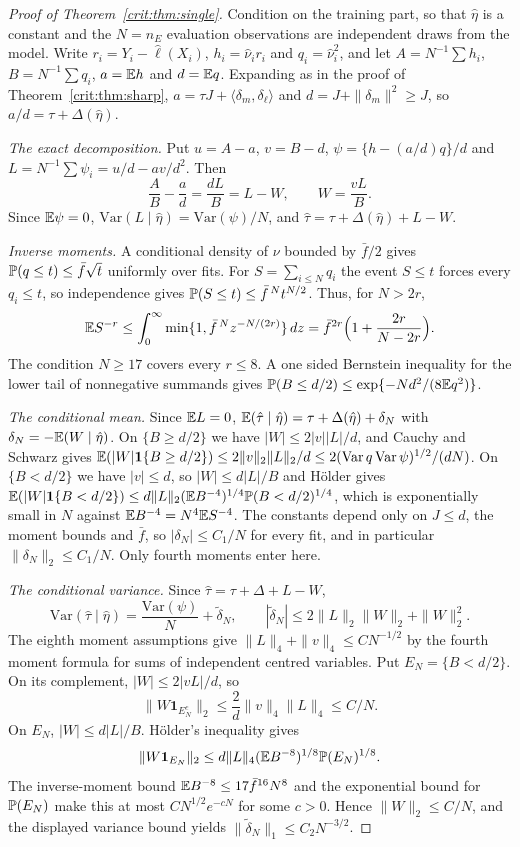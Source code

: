 \begin{proof}[Proof of Theorem~\ref{crit:thm:single}]
Condition on the training part, so that $\hat\eta$ is a constant and the $N = n_E$ evaluation observations are independent draws from the model. Write $r_i = Y_i - \hat\ell(X_i)$, $h_i = \hat\nu_i r_i$ and $q_i = \hat\nu_i^2$, and let $A = N^{-1}\sum h_i$, $B = N^{-1}\sum q_i$, $a = \mathbb{E} h$ and $d = \mathbb{E} q$. Expanding as in the proof of Theorem~\ref{crit:thm:sharp}, $a = \tau J + \langle\delta_m,\delta_\ell\rangle$ and $d = J + \|\delta_m\|^2 \ge J$, so $a/d = \tau + \Delta(\hat\eta)$.

\emph{The exact decomposition.} Put $u=A-a$, $v=B-d$, $\psi=\{h-(a/d)q\}/d$ and $L=N^{-1}\sum\psi_i=u/d-av/d^2$. Then
\[
\frac AB-\frac ad=\frac{dL}{B}=L-W,\qquad W=\frac{vL}{B}.
\]
Since $\mathbb{E}\psi=0$, $\mathrm{Var}(L\mid\hat\eta)=\mathrm{Var}(\psi)/N$, and $\hat\tau=\tau+\Delta(\hat\eta)+L-W$.

\emph{Inverse moments.} A conditional density of $\nu$ bounded by $\bar f/2$ gives $\mathbb{P}(q\le t)\le\bar f\sqrt t$ uniformly over fits. For $S=\sum_{i\le N}q_i$ the event $S\le t$ forces every $q_i\le t$, so independence gives $\mathbb{P}(S\le t)\le\bar f^{\,N}t^{N/2}$. Thus, for $N>2r$,
\[
\mathbb{E} S^{-r}\le\int_0^\infty\min\{1,\bar f^{\,N}z^{-N/(2r)}\}\,dz
=\bar f^{2r}\Bigl(1+\frac{2r}{N-2r}\Bigr).
\]
The condition $N\ge17$ covers every $r\le8$. A one sided Bernstein inequality for the lower tail of nonnegative summands gives $\mathbb{P}(B\le d/2)\le\exp\{-Nd^2/(8\mathbb{E} q^2)\}$.

\emph{The conditional mean.} Since $\mathbb{E} L = 0$, $\mathbb{E}(\hat\tau \mid \hat\eta) = \tau + \Delta(\hat\eta) + \delta_N$ with $\delta_N = -\mathbb{E}(W \mid \hat\eta)$. On $\{B \ge d/2\}$ we have $|W| \le 2|v||L|/d$, and Cauchy and Schwarz gives $\mathbb{E}(|W|\mathbf 1\{B \ge d/2\}) \le 2\|v\|_2\|L\|_2/d \le 2(\mathrm{Var}\,q\,\mathrm{Var}\,\psi)^{1/2}/(dN)$. On $\{B < d/2\}$ we have $|v| \le d$, so $|W| \le d|L|/B$ and H\"older gives $\mathbb{E}(|W|\mathbf 1\{B < d/2\}) \le d\|L\|_2(\mathbb{E} B^{-4})^{1/4}\mathbb{P}(B < d/2)^{1/4}$, which is exponentially small in $N$ against $\mathbb{E} B^{-4} = N^4\mathbb{E} S^{-4}$. The constants depend only on $J \le d$, the moment bounds and $\bar f$, so $|\delta_N| \le C_1/N$ for every fit, and in particular $\|\delta_N\|_2 \le C_1/N$. Only fourth moments enter here.

\emph{The conditional variance.} Since $\hat\tau=\tau+\Delta+L-W$,
\[
\mathrm{Var}(\hat\tau\mid\hat\eta)=\frac{\mathrm{Var}(\psi)}N+\tilde\delta_N,\qquad
|\tilde\delta_N|\le2\|L\|_2\|W\|_2+\|W\|_2^2.
\]
The eighth moment assumptions give $\|L\|_4+\|v\|_4\le CN^{-1/2}$ by the fourth moment formula for sums of independent centred variables. Put $E_N=\{B<d/2\}$. On its complement, $|W|\le2|vL|/d$, so
\[
\|W\mathbf1_{E_N^c}\|_2\le\frac2d\|v\|_4\|L\|_4\le C/N.
\]
On $E_N$, $|W|\le d|L|/B$. Hölder's inequality gives
\[
\|W\mathbf1_{E_N}\|_2\le d\|L\|_4(\mathbb{E} B^{-8})^{1/8}\mathbb{P}(E_N)^{1/8}.
\]
The inverse-moment bound $\mathbb{E} B^{-8}\le17\bar f^{16}N^8$ and the exponential bound for $\mathbb{P}(E_N)$ make this at most $CN^{1/2}e^{-cN}$ for some $c>0$. Hence $\|W\|_2\le C/N$, and the displayed variance bound yields $\|\tilde\delta_N\|_1\le C_2N^{-3/2}$.


\end{proof}
